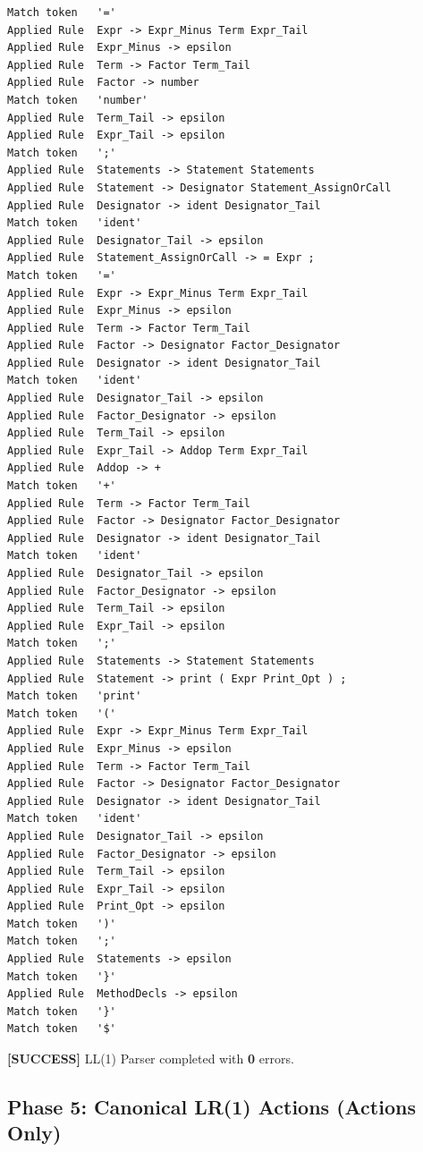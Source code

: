 \documentclass[11pt,a4paper]{article}
\begin{document}
\begin{lstlisting}[style=outputstyle]
Match token   '='
Applied Rule  Expr -> Expr_Minus Term Expr_Tail
Applied Rule  Expr_Minus -> epsilon
Applied Rule  Term -> Factor Term_Tail
Applied Rule  Factor -> number
Match token   'number'
Applied Rule  Term_Tail -> epsilon
Applied Rule  Expr_Tail -> epsilon
Match token   ';'
Applied Rule  Statements -> Statement Statements
Applied Rule  Statement -> Designator Statement_AssignOrCall
Applied Rule  Designator -> ident Designator_Tail
Match token   'ident'
Applied Rule  Designator_Tail -> epsilon
Applied Rule  Statement_AssignOrCall -> = Expr ;
Match token   '='
Applied Rule  Expr -> Expr_Minus Term Expr_Tail
Applied Rule  Expr_Minus -> epsilon
Applied Rule  Term -> Factor Term_Tail
Applied Rule  Factor -> Designator Factor_Designator
Applied Rule  Designator -> ident Designator_Tail
Match token   'ident'
Applied Rule  Designator_Tail -> epsilon
Applied Rule  Factor_Designator -> epsilon
Applied Rule  Term_Tail -> epsilon
Applied Rule  Expr_Tail -> Addop Term Expr_Tail
Applied Rule  Addop -> +
Match token   '+'
Applied Rule  Term -> Factor Term_Tail
Applied Rule  Factor -> Designator Factor_Designator
Applied Rule  Designator -> ident Designator_Tail
Match token   'ident'
Applied Rule  Designator_Tail -> epsilon
Applied Rule  Factor_Designator -> epsilon
Applied Rule  Term_Tail -> epsilon
Applied Rule  Expr_Tail -> epsilon
Match token   ';'
Applied Rule  Statements -> Statement Statements
Applied Rule  Statement -> print ( Expr Print_Opt ) ;
Match token   'print'
Match token   '('
Applied Rule  Expr -> Expr_Minus Term Expr_Tail
Applied Rule  Expr_Minus -> epsilon
Applied Rule  Term -> Factor Term_Tail
Applied Rule  Factor -> Designator Factor_Designator
Applied Rule  Designator -> ident Designator_Tail
Match token   'ident'
Applied Rule  Designator_Tail -> epsilon
Applied Rule  Factor_Designator -> epsilon
Applied Rule  Term_Tail -> epsilon
Applied Rule  Expr_Tail -> epsilon
Applied Rule  Print_Opt -> epsilon
Match token   ')'
Match token   ';'
Applied Rule  Statements -> epsilon
Match token   '}'
Applied Rule  MethodDecls -> epsilon
Match token   '}'
Match token   '$'
\end{lstlisting}

\begin{tcolorbox}[successbox]
\textbf{\color{SuccessGreen}[SUCCESS]} LL(1) Parser completed with \textbf{0} errors.
\end{tcolorbox}

\subsection{Phase 5: Canonical LR(1) Actions (Actions Only)}
\end{document}
